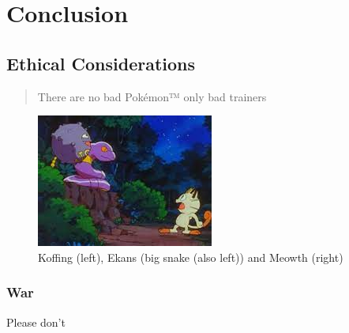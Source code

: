 \chapter{Conclusion}

\section{Ethical Considerations}

\begin{quote}
\centering 
There are no bad Pokémon™ only bad trainers
\end{quote}

\begin{figure}[!h]
    \centering
    \includegraphics{diagrams/pokemon.jpeg}
    \caption[Ethical Considerations]{Koffing (left), Ekans (big snake (also left)) and Meowth (right)}
\end{figure}

\subsection{War}
Please don't